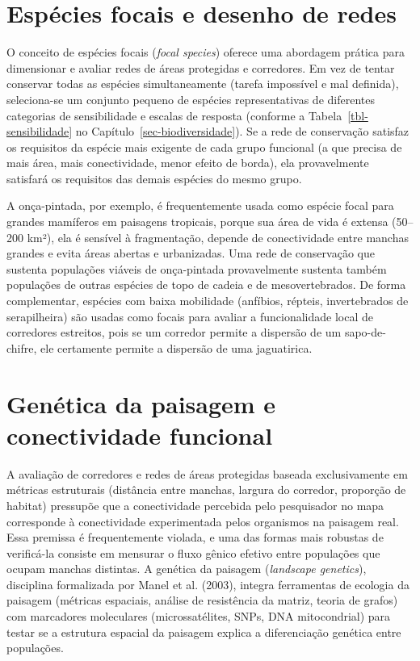 \documentclass[
  portuguese,
  11pt,
  a4paper,
  open=any]{scrbook}
\begin{document}
\section{Espécies focais e desenho de
redes}\label{espuxe9cies-focais-e-desenho-de-redes}

O conceito de espécies focais (\emph{focal species}) oferece uma
abordagem prática para dimensionar e avaliar redes de áreas protegidas e
corredores. Em vez de tentar conservar todas as espécies simultaneamente
(tarefa impossível e mal definida), seleciona-se um conjunto pequeno de
espécies representativas de diferentes categorias de sensibilidade e
escalas de resposta (conforme a Tabela~\ref{tbl-sensibilidade} no
Capítulo~\ref{sec-biodiversidade}). Se a rede de conservação satisfaz os
requisitos da espécie mais exigente de cada grupo funcional (a que
precisa de mais área, mais conectividade, menor efeito de borda), ela
provavelmente satisfará os requisitos das demais espécies do mesmo
grupo.

A onça-pintada, por exemplo, é frequentemente usada como espécie focal
para grandes mamíferos em paisagens tropicais, porque sua área de vida é
extensa (50--200 km²), ela é sensível à fragmentação, depende de
conectividade entre manchas grandes e evita áreas abertas e urbanizadas.
Uma rede de conservação que sustenta populações viáveis de onça-pintada
provavelmente sustenta também populações de outras espécies de topo de
cadeia e de mesovertebrados. De forma complementar, espécies com baixa
mobilidade (anfíbios, répteis, invertebrados de serapilheira) são usadas
como focais para avaliar a funcionalidade local de corredores estreitos,
pois se um corredor permite a dispersão de um sapo-de-chifre, ele
certamente permite a dispersão de uma jaguatirica.

\section{Genética da paisagem e conectividade
funcional}\label{genuxe9tica-da-paisagem-e-conectividade-funcional}

A avaliação de corredores e redes de áreas protegidas baseada
exclusivamente em métricas estruturais (distância entre manchas, largura
do corredor, proporção de habitat) pressupõe que a conectividade
percebida pelo pesquisador no mapa corresponde à conectividade
experimentada pelos organismos na paisagem real. Essa premissa é
frequentemente violada, e uma das formas mais robustas de verificá-la
consiste em mensurar o fluxo gênico efetivo entre populações que ocupam
manchas distintas. A genética da paisagem (\emph{landscape genetics}),
disciplina formalizada por Manel et al. (2003), integra ferramentas de
ecologia da paisagem (métricas espaciais, análise de resistência da
matriz, teoria de grafos) com marcadores moleculares (microssatélites,
SNPs, DNA mitocondrial) para testar se a estrutura espacial da paisagem
explica a diferenciação genética entre populações.
\end{document}
